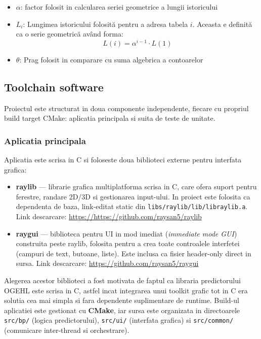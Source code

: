 \begin{itemize}
	\item $\alpha$: factor folosit in calcularea seriei geometrice a lungii istoricului
	\item $L_i$: Lungimea istoricului folosită pentru a adresa tabela $i$. Aceasta e definită ca o serie geometrică având forma:
	\[
	L(i) = \alpha^{i-1} \cdot L(1)
	\]
	\item $\theta$: Prag folosit in comparare cu suma algebrica a contoarelor
\end{itemize}

\subsection{Toolchain software}
\label{sec:toolchain}

Proiectul este structurat in doua componente independente, fiecare cu
propriul build target CMake: aplicatia principala si suita de teste de unitate.

\subsubsection*{Aplicatia principala}

Aplicatia este scrisa in C si foloseste doua biblioteci externe pentru
interfata grafica:

\begin{itemize}
    \item \textbf{raylib} --- librarie grafica multiplatforma scrisa in C,
          care ofera suport pentru ferestre, randare 2D/3D si gestionarea
          input-ului. In proiect este folosita ca dependenta de baza,
          link-editat static din \texttt{libs/raylib/lib/libraylib.a}. Link descarcare:  \url{https://https://github.com/raysan5/raylib}
    \item \textbf{raygui} --- biblioteca \cite{raygui} pentru UI in mod imediat (\textit{immediate
          mode GUI}) construita peste raylib, folosita pentru a crea
          toate controalele interfetei (campuri de text, butoane, liste).
          Este inclusa ca fisier header-only direct in sursa. Link descarcare: \url{https://github.com/raysan5/raygui}
\end{itemize}

Alegerea acestor biblioteci a fost motivata de faptul ca libraria
predictorului OGEHL este scrisa in C, astfel incat integrarea unui
toolkit grafic tot in C era solutia cea mai simpla si fara dependente
suplimentare de runtime. Build-ul aplicatiei este gestionat cu
\textbf{CMake}, iar sursa este organizata in directoarele
\texttt{src/bp/} (logica predictorului), \texttt{src/ui/} (interfata
grafica) si \texttt{src/common/} (comunicare inter-thread si
orchestrare).

